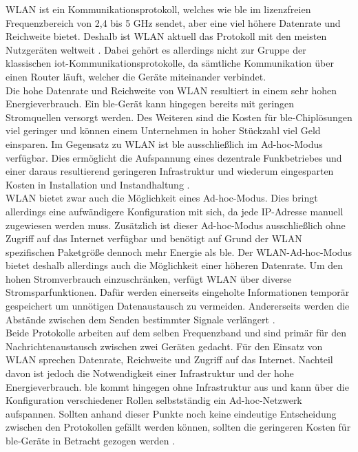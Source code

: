 \noindent WLAN ist ein Kommunikationsprotokoll, welches wie \ac{ble} im lizenzfreien Frequenzbereich von 2,4 bis 5 GHz sendet, aber eine viel höhere Datenrate und Reichweite bietet. Deshalb ist WLAN aktuell das Protokoll mit den meisten Nutzgeräten weltweit \cite[Seite 193f]{Gessler15:WNN}. Dabei gehört es allerdings nicht zur Gruppe der klassischen \ac{iot}-Kommunikationsprotokolle, da sämtliche Kommunikation über einen Router läuft, welcher die Geräte miteinander verbindet.\\
\noindent Die hohe Datenrate und Reichweite von WLAN resultiert in einem sehr hohen Energieverbrauch. Ein \ac{ble}-Gerät kann hingegen bereits mit geringen Stromquellen versorgt werden. Des Weiteren sind die Kosten für \ac{ble}-Chiplösungen viel geringer und können einem Unternehmen in hoher Stückzahl viel Geld einsparen. Im Gegensatz zu WLAN ist \ac{ble} ausschließlich im Ad-hoc-Modus verfügbar. Dies ermöglicht die Aufspannung eines dezentrale Funkbetriebes und einer daraus resultierend geringeren Infrastruktur und wiederum eingesparten Kosten in Installation und Instandhaltung \cite[Seite 206]{Gessler15:WNN}.\\
\noindent WLAN bietet zwar auch die Möglichkeit eines Ad-hoc-Modus. Dies bringt allerdings eine aufwändigere Konfiguration mit sich, da jede IP-Adresse manuell zugewiesen werden muss. Zusätzlich ist dieser Ad-hoc-Modus ausschließlich ohne Zugriff auf das Internet verfügbar und benötigt auf Grund der WLAN spezifischen Paketgröße dennoch mehr Energie als \ac{ble}. Der WLAN-Ad-hoc-Modus bietet deshalb allerdings auch die Möglichkeit einer höheren Datenrate. Um den hohen Stromverbrauch einzuschränken, verfügt WLAN über diverse Stromsparfunktionen. Dafür werden einerseits eingeholte Informationen temporär gespeichert um unnötigen Datenaustausch zu vermeiden. Andererseits werden die Abstände zwischen dem Senden bestimmter Signale verlängert \cite[Seite 240ff]{Gessler15:WNN}.\\ 
\noindent Beide Protokolle arbeiten auf dem selben Frequenzband und sind primär für den Nachrichtenaustausch zwischen zwei Geräten gedacht. Für den Einsatz von WLAN sprechen Datenrate, Reichweite und Zugriff auf das Internet. Nachteil davon ist jedoch die Notwendigkeit einer Infrastruktur und der hohe Energieverbrauch. \ac{ble} kommt hingegen ohne Infrastruktur aus und kann über die Konfiguration verschiedener Rollen selbstständig ein Ad-hoc-Netzwerk aufspannen. Sollten anhand dieser Punkte noch keine eindeutige Entscheidung zwischen den Protokollen gefällt werden können, sollten die geringeren Kosten für \ac{ble}-Geräte in Betracht gezogen werden \cite[Seite 271]{Gessler15:WNN}.\\   

